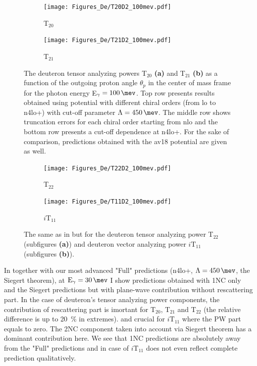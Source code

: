     \begin{figure}[htb]
        \centering
        \begin{subfigure}[b]{0.46\textwidth}
            \caption{T$_{20}$}
            \texttt{[image: Figures\_De/T20D2\_100mev.pdf]}
            \label{T20_100_vert}
        \end{subfigure}
        \begin{subfigure}[b]{0.46\textwidth}
            \caption{T$_{21}$}
            \texttt{[image: Figures\_De/T21D2\_100mev.pdf]}
            \label{T21_100_vert}
        \end{subfigure}
        \caption{The deuteron tensor analyzing powers T$_{20}$  {\bf (a)}
        and T$_{21}$ {\bf (b)}
        as a function of the outgoing proton angle $\theta_p$ in the center of mass frame 
        for the photon energy E$_\gamma=\SI{100}{\mev}$.
        Top row presents results obtained using potential
        with different chiral orders (from \gls{lo} to \gls{n4lo+}) with cut-off parameter $\Lambda=\SI{450}{\mev}$.
        The middle row shows truncation errors for each 
        chiral order starting from \gls{nlo} and the
        bottom row presents a cut-off dependence at \gls{n4lo+}.
        For the sake of comparison, predictions obtained with the \gls{av18} potential are given as well.}
        \label{T20_T21_100}
    \end{figure}

    \begin{figure}[htb]
        \centering
        \begin{subfigure}[b]{0.46\textwidth}
            \caption{T$_{22}$}
            \texttt{[image: Figures\_De/T22D2\_100mev.pdf]}
            \label{T22_100_vert}
        \end{subfigure}
        \begin{subfigure}[b]{0.46\textwidth}
            \caption{$i\text{T}_{11}$}
            \texttt{[image: Figures\_De/T11D2\_100mev.pdf]}
            \label{T11_100_vert}
        \end{subfigure}
        \caption{The same as in  but for the deuteron tensor analyzing power
        T$_{22}$ (subfigures {\bf (a)}) and deuteron vector analyzing power $i\text{T}_{11}$ (subfigures {\bf (b)}).}
        \label{T22_T11_100}
    \end{figure}

    In  together with our most advanced "Full" predictions 
    (\gls{n4lo+}, $\Lambda=\SI{450}{\mev}$, the Siegert theorem),
    at $\text{E}_\gamma = \SI{30}{\mev}$ 
    I show predictions obtained with 1NC only and 
    the Siegert predictions but with plane-wave contribution without rescattering part.
    In the case of deuteron's tensor analyzing power components, the contribution of rescattering part is  
    imortant for T$_{20}$, T$_{21}$ and T$_{22}$ (the relative difference is up to \SI{20}{\percent} 
    in extremes).
    and crucial for
    $i\text{T}_{11}$ where the PW part equals to zero.
    The 2NC component taken into account via Siegert theorem has a dominant contribution here. We see that 
    1NC predictions are absolutely away from the "Full" predictions and in case of $i\text{T}_{11}$
    does not even reflect complete prediction qualitatively.


